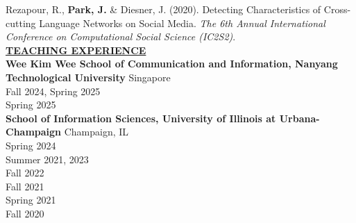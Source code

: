 \documentclass{article}
\begin{document}
\noindent Rezapour, R., \textbf{Park, J.} \& Diesner, J. (2020). Detecting Characteristics of Cross-cutting Language Networks on Social Media. \textit{The 6th Annual International Conference on Computational Social Science (IC2S2)}. \\


\noindent \textbf{\underline{TEACHING EXPERIENCE}} \\
\noindent \textbf{Wee Kim Wee School of Communication and Information, Nanyang Technological University} \hfill Singapore \\
 \hfill Fall 2024, Spring 2025 \\
 \hfill Spring 2025 \\ 


\noindent \textbf{School of Information Sciences, University of Illinois at Urbana-Champaign} \hfill Champaign, IL \\
 \hfill Spring 2024 \\
 \hfill Summer 2021, 2023 \\
 \hfill Fall 2022 \\
 \hfill Fall 2021 \\
 \hfill Spring 2021 \\
 \hfill Fall 2020 \\

\end{document}
